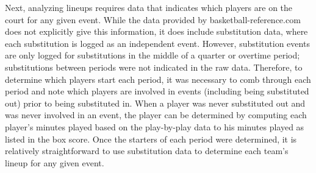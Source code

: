Next, analyzing lineups requires data that indicates which players are on the court
for any given event. While the data provided by basketball-reference.com does not
explicitly give this information, it does include substitution data, where each
substitution is logged as an independent event. However, substitution events are
only logged for substitutions in the middle of a quarter or overtime period;
substitutions between periods were not indicated in the raw data. Therefore, to
determine which players start each period, it was necessary to comb through each
period and note which players are involved in events (including being substituted
out) prior to being substituted in. When a player was never substituted out and was
never involved in an event, the player can be determined by computing each player's
minutes played based on the play-by-play data to his minutes played as listed in the
box score. Once the starters of each period were determined, it is relatively
straightforward to use substitution data to determine each team's lineup for any
given event.


